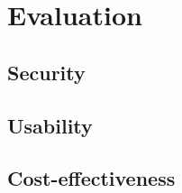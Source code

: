 \section{Evaluation}

\subsection{Security}

\subsection{Usability}

\subsection{Cost-effectiveness}